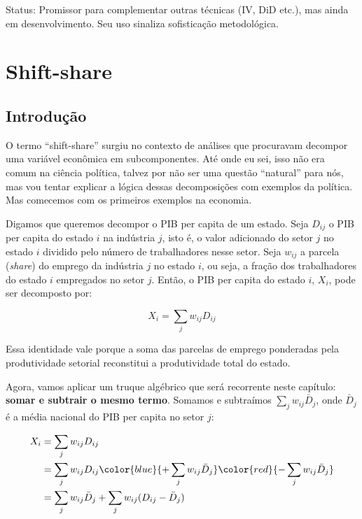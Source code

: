 \documentclass[
]{article}
\begin{document}
Status: Promissor para complementar outras técnicas (IV, DiD etc.), mas ainda em desenvolvimento. Seu uso sinaliza sofisticação metodológica.

\section{Shift-share}\label{shift-share}

\subsection{Introdução}\label{introduuxe7uxe3o-8}

O termo ``shift-share'' surgiu no contexto de análises que procuravam decompor uma variável econômica em subcomponentes. Até onde eu sei, isso não era comum na ciência política, talvez por não ser uma questão ``natural'' para nós, mas vou tentar explicar a lógica dessas decomposições com exemplos da política. Mas comecemos com os primeiros exemplos na economia.

Digamos que queremos decompor o PIB per capita de um estado. Seja \(D_{ij}\) o PIB per capita do estado \(i\) na indústria \(j\), isto é, o valor adicionado do setor \(j\) no estado \(i\) dividido pelo número de trabalhadores nesse setor. Seja \(w_{ij}\) a parcela (\emph{share}) do emprego da indústria \(j\) no estado \(i\), ou seja, a fração dos trabalhadores do estado \(i\) empregados no setor \(j\). Então, o PIB per capita do estado \(i\), \(X_i\), pode ser decomposto por:

\[X_i = \sum_j w_{ij}D_{ij}\]

Essa identidade vale porque a soma das parcelas de emprego ponderadas pela produtividade setorial reconstitui a produtividade total do estado.

Agora, vamos aplicar um truque algébrico que será recorrente neste capítulo: \textbf{somar e subtrair o mesmo termo}. Somamos e subtraímos \(\sum_j w_{ij}\bar{D}_{j}\), onde \(\bar{D}_{j}\) é a média nacional do PIB per capita no setor \(j\):

\begin{equation}
\begin{aligned}
X_i &= \sum_j w_{ij}D_{ij} \\
    &= \sum_j w_{ij}D_{ij} \color{blue}{+ \sum_j w_{ij}\bar{D}_{j}} \color{red}{- \sum_j w_{ij}\bar{D}_{j}} \\
    &= \sum_j w_{ij}\bar{D}_{j} + \sum_j w_{ij}(D_{ij} - \bar{D}_{j})
\end{aligned}
\label{eq:ss-decomp}
\end{equation}
\end{document}
